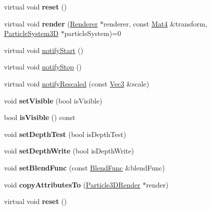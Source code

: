 \begin{DoxyCompactItemize}
\item 
\mbox{\label{classParticle3DRender_a7cbb0e9bf6ae8c35519ff71259dcef14}} 
virtual void {\bfseries reset} ()
\item 
\mbox{\label{classParticle3DRender_a9269459c14917229ae212ecca5d84e89}} 
virtual void {\bfseries render} (\hyperlink{classRenderer}{Renderer} $\ast$renderer, const \hyperlink{classMat4}{Mat4} \&transform, \hyperlink{classParticleSystem3D}{Particle\+System3D} $\ast$particle\+System)=0
\item 
virtual void \hyperlink{classParticle3DRender_abf92e3a07925ce5b936322280cb59068}{notify\+Start} ()
\item 
virtual void \hyperlink{classParticle3DRender_a6628567a7c0f610931af8b83b4de18ca}{notify\+Stop} ()
\item 
virtual void \hyperlink{classParticle3DRender_ac68901a08643ebcbe115042011bc6119}{notify\+Rescaled} (const \hyperlink{classVec3}{Vec3} \&scale)
\item 
\mbox{\label{classParticle3DRender_a6c8ec8edf2766b4dd45baedec7d284d2}} 
void {\bfseries set\+Visible} (bool is\+Visible)
\item 
\mbox{\label{classParticle3DRender_ac92778a2a9bcf26e85fddbe71fdf3db5}} 
bool {\bfseries is\+Visible} () const
\item 
\mbox{\label{classParticle3DRender_a72df0452fb9fae7d3f27f75570a427ce}} 
void {\bfseries set\+Depth\+Test} (bool is\+Depth\+Test)
\item 
\mbox{\label{classParticle3DRender_ad9ee8ff527b267fc8f54a5afe90e049a}} 
void {\bfseries set\+Depth\+Write} (bool is\+Depth\+Write)
\item 
\mbox{\label{classParticle3DRender_a49b7cbcad64a40ddec0508a1b7ed3f7a}} 
void {\bfseries set\+Blend\+Func} (const \hyperlink{structBlendFunc}{Blend\+Func} \&blend\+Func)
\item 
\mbox{\label{classParticle3DRender_a8463dcf17d5a05ac2a81df7978dbc52b}} 
void {\bfseries copy\+Attributes\+To} (\hyperlink{classParticle3DRender}{Particle3\+D\+Render} $\ast$render)
\item 
\mbox{\label{classParticle3DRender_a7cbb0e9bf6ae8c35519ff71259dcef14}} 
virtual void {\bfseries reset} ()
\end{DoxyCompactItemize}
